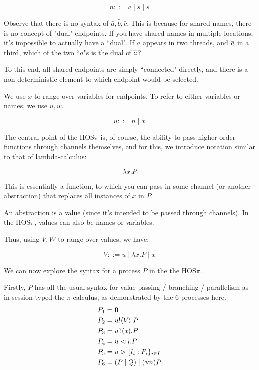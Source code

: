 $$
n ::= a \mid s \mid \bar{s}
$$

Observe that there is no syntax of $\bar{a}, \bar{b}, \bar{c}$. This is because for shared names, there is no concept of "dual" endpoints. If you have shared names in multiple locations, it's impossible to actually have a ``dual". If $a$ appears in two threads, and $\overline{a}$ in a third, which of the two ``$a$"s is the dual of $\overline{a}$?

To this end, all shared endpoints are simply ``connected" directly, and there is a non-deterministic element to which endpoint would be selected.

We use $x$ to range over variables for endpoints. To refer to either variables or names, we use $u,w$.

$$
u ::= n \mid x
$$


The central point of the HOS$\pi$ is, of course, the ability to pass higher-order functions through channels themselves, and for this, we introduce notation similar to that of lambda-calculus:

$$
\lambda x.  P
$$

This is essentially a function, to which you can pass in some channel (or another abstraction) that replaces all instances of $x$ in $P$. 

An abstraction is a value (since it's intended to be passed through channels). In the HOS$\pi$, values can also be names or variables.

Thus, using $V,W$ to range over values, we have:

$$
V ::= u \mid \lambda x . P \mid x
$$


We can now explore the syntax for a process $P$ in the the HOS$\pi$.

Firstly, $P$ has all the usual syntax for value passing / branching / parallelism as in session-typed the $\pi$-calculus, as demonstrated by the 6 processes here.
\begin{align*}
P_1 &= \textbf{0} \\
P_2 &= u!\langle V \rangle.P \\
P_3 &= u?(x).P \\ 
P_4 &= u \vartriangleleft l.P \\ 
P_5 &= u \vartriangleright \{l_i : P_i\}_{i \in I} \\
P_6 &= (P \mid Q)  \mid (\upnu n) P \\
\end{align*}

